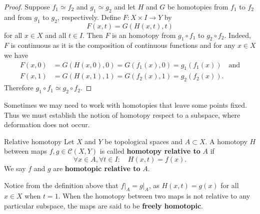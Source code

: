 \begin{proof}
    Suppose \(f_1 \simeq f_2\) and \(g_1 \simeq g_2\) and let \(H\) and \(G\) be homotopies from \(f_1\) to \(f_2\) and from \(g_1\) to \(g_2\), respectively. Define \(F\colon X\times I\to Y\) by \[
        F(x,t) = G(H(x,t),t)
    \] for all \(x\in X\) and all \(t\in I\). Then \(F\) is an homotopy from \(g_1\circ f_1\) to \(g_2\circ f_2\). Indeed, \(F\) is continuous as it is the composition of continuous functions and  for any \(x\in X\) we have \begin{align*}
        F(x,0) &= G(H(x,0),0) = G(f_1(x), 0) = g_1(f_1(x))\quad\text{and}\\
        F(x,1) &= G(H(x,1),1) = G(f_2(x), 1) = g_2(f_2(x)).
    \end{align*}
    Therefore \(g_1\circ f_1 \simeq g_2\circ f_2\).
\end{proof}






Sometimes we may need to work  with homotopies that leave some points fixed. Thus we must establish the notion of homotopy respect to a subspace, where deformation does not occur.

\begin{definition}{Relative homotopy}{}
    Let \(X\) and \(Y\) be topological spaces and \(A\subset X\). A homotopy \(H\) between   maps \(f,g\in \mathcal{C}(X,Y)\) is called \textbf{homotopy relative to} \(A\) if \[
        \forall x\in A,\forall t\in I : \quad H(x,t) = f(x).
    \] We say \(f\) and \(g\) are \textbf{homotopic relative to} \(A\).
\end{definition}

Notice from the definition above that \( f\rvert_A = g\rvert_A \), as \(H(x,t) = g(x)\) for all \(x\in X\) when \(t=1\). When the homotopy between two maps is not relative to any particular subspace, the maps are said to be  \textbf{freely homotopic}.

